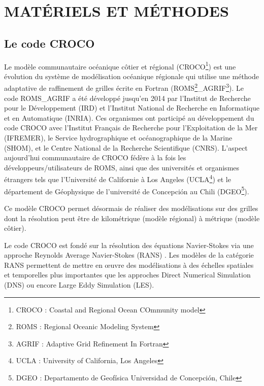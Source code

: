\documentclass[10pt,a4paper,titlepage]{article}
\begin{document}
    \newpage

    \section{MATÉRIELS ET MÉTHODES}
    \label{sec:materiel_methodes}

    \subsection{Le code CROCO}
    \label{sub:croco}
    Le modèle communautaire océanique côtier et régional (CROCO\footnote{CROCO : Coastal and Regional Ocean COmmunity model}) est une évolution du système de modélisation océanique régionale qui utilise une méthode adaptative de raffinement de grilles écrite en Fortran (ROMS\footnote{ROMS : Regional Oceanic Modeling System}\_AGRIF\footnote{AGRIF : Adaptive Grid Refinement In Fortran}).
    Le code ROMS\_AGRIF a été développé jusqu'en 2014 par l'Institut de Recherche pour le Développement (IRD) et l'Institut National de Recherche en Informatique et en Automatique (INRIA). Ces organismes ont participé au développement du code CROCO avec
    l'Institut Français de Recherche pour l'Exploitation de la Mer (IFREMER),
    le Service hydrographique et océanographique de la Marine (SHOM),
    et le Centre National de la Recherche Scientifique (CNRS).
    L'aspect aujourd'hui communautaire de CROCO fédère à la fois les développeurs/utilisateurs de ROMS, ainsi que des universités et organismes étrangers tels que l'Université de Californie à Los Angeles (UCLA\footnote{UCLA : University of California, Los Angeles})
    et le département de Géophysique de l'université de Concepción au Chili (DGEO\footnote{DGEO : Departamento de Geofísica Universidad de Concepción, Chile}).


    Ce modèle CROCO permet désormais de réaliser des modélisations sur des grilles dont la résolution peut être de kilométrique (modèle régional) à métrique (modèle côtier).

    Le code CROCO est fondé sur la résolution des équations Navier-Stokes via une approche Reynolds Average Navier-Stokes (RANS) \parencite{RANS_def}.
Les modèles de la catégorie RANS permettent de mettre en \oe{}uvre des modélisations à des échelles spatiales et temporelles plus importantes que les approches Direct Numerical Simulation (DNS) ou encore Large Eddy Simulation (LES).
\end{document}
